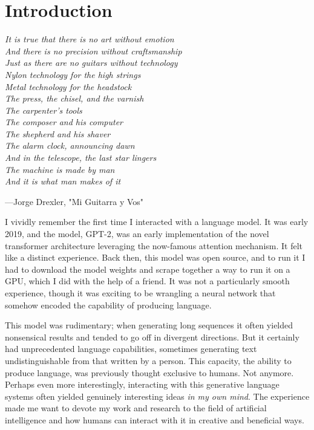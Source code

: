 \chapter{Introduction}


\begin{flushleft}
\begin{minipage}[t]{0.80\textwidth}
\textit{It is true that there is no art without emotion\\
And there is no precision without craftsmanship\\
Just as there are no guitars without technology\\
Nylon technology for the high strings\\
Metal technology for the headstock\\
The press, the chisel, and the varnish\\
The carpenter's tools\\
The composer and his computer\\
The shepherd and his shaver\\
The alarm clock, announcing dawn\\
And in the telescope, the last star lingers\\
The machine is made by man\\
And it is what man makes of it}
\end{minipage}

\medskip
\hfill---Jorge Drexler, "Mi Guitarra y Vos"
\end{flushleft}

\bigskip

I vividly remember the first time I interacted with a language model. It was early 2019, and the model, GPT-2, was an early implementation of the novel transformer architecture leveraging the now-famous attention mechanism. It felt like a distinct experience. Back then, this model was open source, and to run it I had to download the model weights and scrape together a way to run it on a GPU, which I did with the help of a friend. It was not a particularly smooth experience, though it was exciting to be wrangling a neural network that somehow encoded the capability of producing language.

This model was rudimentary; when generating long sequences it often yielded nonsensical results and tended to go off in divergent directions. But it certainly had unprecedented language capabilities, sometimes generating text undistinguishable from that written by a person. This capacity, the ability to produce language, was previously thought exclusive to humans. Not anymore. Perhaps even more interestingly, interacting with this generative language systems often yielded genuinely interesting ideas \textit{in my own mind}.  The experience made me want to devote my work and research to the field of artificial intelligence and how humans can interact with it in creative and beneficial ways.

